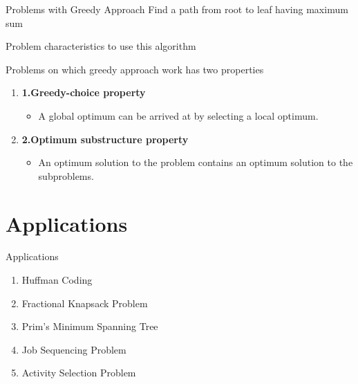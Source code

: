 \documentclass{beamer}
\begin{document}
\begin{frame}{Problems with Greedy Approach }
Find a path from root to leaf having maximum sum\newline


\end{frame}

\begin{frame}{Problem characteristics to use this algorithm }

Problems on which greedy approach work has two properties \newline
{}

\begin{enumerate}
    \item \textbf{1.Greedy-choice property}
    \begin{itemize}
        \item A global optimum can be arrived at by selecting a local optimum.
        
    \end{itemize} \pause
    
    \item \textbf{2.Optimum substructure property}
    \begin{itemize}
        \item An optimum solution to the problem contains an optimum solution to the subproblems.
        
    \end{itemize} 
\end{enumerate}

\end{frame}

\section{Applications}
\begin{frame}{Applications}
\begin{enumerate}
    \item Huffman Coding
    \item<2-> Fractional Knapsack Problem 
    \item<3-> Prim's Minimum Spanning Tree
    
    \item<4-> Job Sequencing Problem
    
    \item<5-> Activity Selection Problem



\end{enumerate}

\end{frame}
\end{document}
